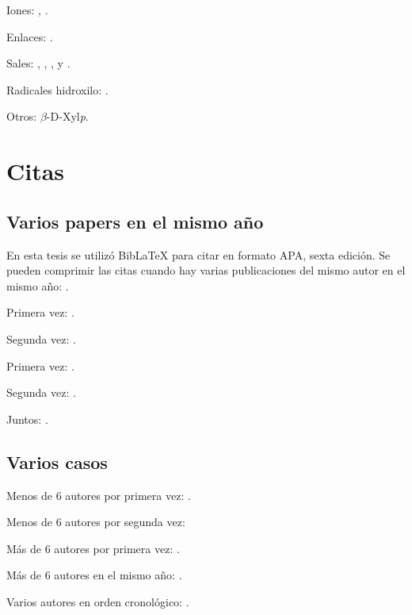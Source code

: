Iones: , .

Enlaces: .

Sales: , , ,  y .

Radicales hidroxilo: .

Otros: $\beta$-{\scriptsize D}-{X}yl\textit{p}.



\section{Citas}
\subsection{Varios papers en el mismo año}
En esta tesis se utilizó Bib{\LaTeX} para citar en formato APA, sexta edición. Se pueden comprimir las citas cuando hay varias publicaciones del mismo autor en el mismo año: \citep{king200nonstationary, king2000semiparametric, king2001gaussian,king2001regression}.

Primera vez: \citep{wang2012optimization}.

Segunda vez: \citep{wang2012optimization}.

Primera vez: \citep{wang2014optimisation}.

Segunda vez: \citep{wang2014optimisation}.

Juntos: \citep{wang2014optimisation, wang2012optimization}.


\subsection{Varios casos}
Menos de 6 autores por primera vez: \citep{rosicka2016influence}.

Menos de 6 autores por segunda vez: \citep{rosicka2016influence}

Más de 6 autores por primera vez: \citep{perez2019physicochemical}.

Más de 6 autores en el mismo año: \citep{bender2017optimization,bender2017chemical}.

Varios autores en orden cronológico: \citep{zhang2014extraction, gonzalez2015covalently, rosicka2016influence}.

